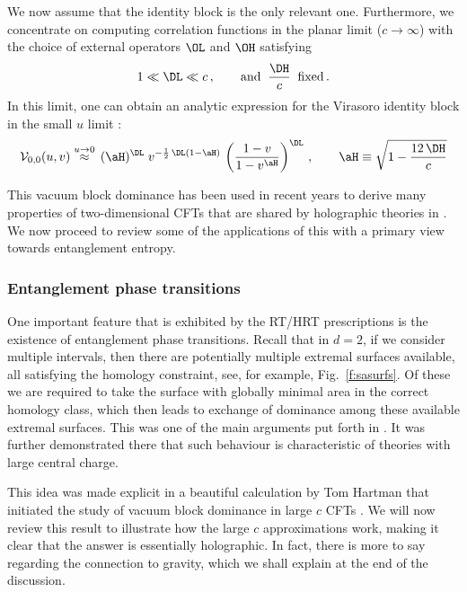 \documentclass[12pt,openany]{book}
\begin{document}
We now assume that the identity block is the only relevant one. Furthermore, we concentrate on computing correlation functions in the planar limit ($c \to \infty$) with the choice of external operators $\OL$ and $\OH$ satisfying
%
\begin{equation}
 1 \ll \DL \ll c \,, \qquad \text{and} \;\; \frac{\DH}{c} \;\; \text{fixed}\,.
\label{eq:lhscaling}
\end{equation}
%
In this limit, one can obtain an analytic expression for the Virasoro identity block in the small $u$ limit \cite{Fitzpatrick:2014vua,Fitzpatrick:2015zha}:
%
\begin{equation}
{\cal V}_{0,0}(u,v)  \overset{u\to 0}{\approx}  \, (\aH)^{\DL} \; v^{-\frac{1}{2}\, \DL (1-\aH)} \,
\left(\frac{1-v}{1-v^{\aH}}\right)^{\DL} \,, \qquad \aH \equiv \sqrt{1-\frac{12\, \DH}{c}}
\label{eq:vir0}
\end{equation}
%

This vacuum block dominance has been used in recent years to derive many properties of two-dimensional CFTs that are shared by holographic theories in . We now proceed to review some of the applications of this with a primary view towards entanglement entropy.


\subsubsection{Entanglement phase transitions}
\label{sec:ephases}

One important feature that is exhibited by the RT/HRT prescriptions is the existence of entanglement phase transitions. Recall that in $d=2$, if we consider multiple intervals, then there are potentially multiple extremal surfaces available, all satisfying the homology constraint, see, for example, Fig.~\ref{f:sasurfs}. Of these we are required to take the surface with globally minimal area in the correct homology class, which then leads to exchange of dominance among these available extremal surfaces. This was one of the main arguments put forth in \cite{Headrick:2010zt}. It was further demonstrated there that such behaviour is characteristic of theories with large central charge.

This idea was made explicit in a beautiful calculation by Tom Hartman that initiated the study of vacuum block dominance in large $c$ CFTs  \cite{Hartman:2013mia}. We will now review this result to illustrate how the large $c$ approximations work, making it clear that the answer is essentially holographic. In fact, there is more to say regarding the connection to gravity, which we shall explain at the end of  the discussion.
\end{document}

